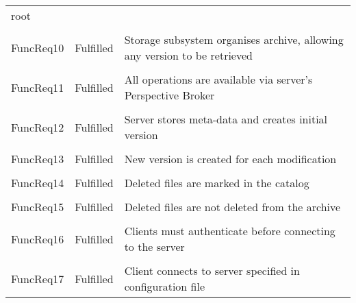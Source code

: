 \begin{longtable}{ l l p{5cm} }
                                                      root
    \\ \\
    FuncReq10           & Fulfilled                 & Storage subsystem
                                                      organises archive,
                                                      allowing any version
                                                      to be retrieved
    \\ \\
    FuncReq11           & Fulfilled                 & All operations are
                                                      available via
                                                      server's Perspective
                                                      Broker
    \\ \\
    FuncReq12           & Fulfilled                 & Server stores
                                                      meta-data and creates
                                                      initial version
    \\ \\
    FuncReq13           & Fulfilled                 & New version is
                                                      created for each
                                                      modification
    \\ \\
    FuncReq14           & Fulfilled                 & Deleted files are
                                                      marked in the catalog
    \\ \\
    FuncReq15           & Fulfilled                 & Deleted files are not
                                                      deleted from the
                                                      archive
    \\ \\
    FuncReq16           & Fulfilled                 & Clients must
                                                      authenticate before
                                                      connecting to the
                                                      server
    \\ \\
    FuncReq17           & Fulfilled                 & Client connects to
                                                      server specified in
                                                      configuration file

\end{longtable}
